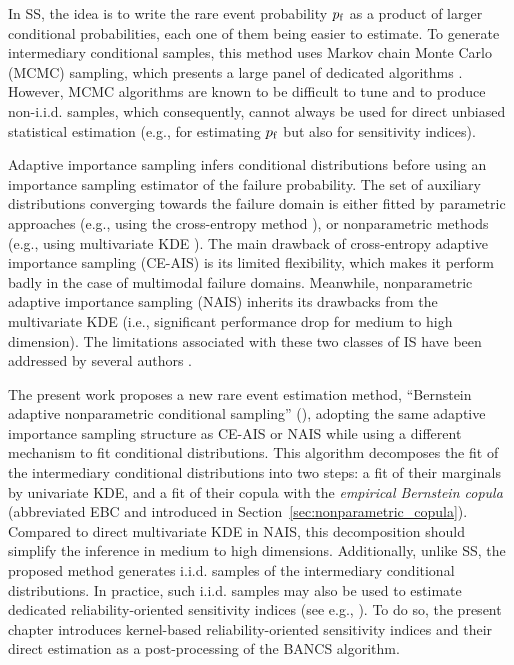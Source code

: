 In SS, the idea is to write the rare event probability $p_\mathrm{f}$ as a product of larger conditional probabilities, each one of them being easier to estimate. 
To generate intermediary conditional samples, this method uses Markov chain Monte Carlo (MCMC) sampling, which presents a large panel of dedicated algorithms \citep{Papaioannou_PEM_2015}. 
However, MCMC algorithms are known to be difficult to tune and to produce non-i.i.d. samples, which consequently, cannot always be used for direct unbiased statistical estimation (e.g., for estimating $p_\mathrm{f}$ but also for sensitivity indices). 

Adaptive importance sampling infers conditional distributions before using an importance sampling estimator of the failure probability. 
The set of auxiliary distributions converging towards the failure domain is either fitted by parametric approaches (e.g., using the cross-entropy method \citealp{rubinstein_2004_CE}), or nonparametric methods (e.g., using multivariate KDE \citealp{zhang_1996_NIS, Morio_RESS_2011}). 
The main drawback of cross-entropy adaptive importance sampling (CE-AIS) is its limited flexibility, which makes it perform badly in the case of multimodal failure domains. 
Meanwhile, nonparametric adaptive importance sampling (NAIS) inherits its drawbacks from the multivariate KDE (i.e., significant performance drop for medium to high dimension). 
The limitations associated with these two classes of IS have been addressed by several authors \citep{kurtz_song_2013_aisce,papaioannou_2016, geyer_2019_aisce, uribe_2021_aisce}.

The present work proposes a new rare event estimation method, ``Bernstein adaptive nonparametric conditional sampling'' (), adopting the same adaptive importance sampling structure as CE-AIS or NAIS while using a different mechanism to fit conditional distributions. 
This algorithm decomposes the fit of the intermediary conditional distributions into two steps: a fit of their marginals by univariate KDE, and a fit of their copula with the \emph{empirical Bernstein copula} (abbreviated EBC and introduced in Section~\ref{sec:nonparametric_copula}). 
Compared to direct multivariate KDE in NAIS, this decomposition should simplify the inference in medium to high dimensions. 
Additionally, unlike SS, the proposed method generates i.i.d. samples of the intermediary conditional distributions. 
In practice, such i.i.d. samples may also be used to estimate dedicated reliability-oriented sensitivity indices (see e.g., \citealp{chabridon2021global,marrel_chabridon_2021}). 
To do so, the present chapter introduces kernel-based reliability-oriented sensitivity indices and their direct estimation as a post-processing of the BANCS algorithm. 

